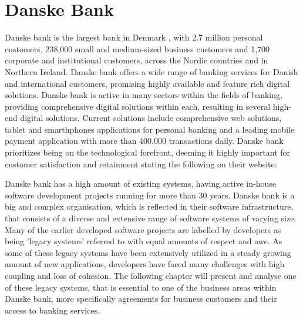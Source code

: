 \chapter{Danske Bank}

Danske bank is the largest bank in Denmark \cite[p.~38]{danske_bank_setting_up_in_denmark}, with 2.7 million personal customers, 238,000 small and medium-sized business customers and 1,700 corporate and institutional customers, across the Nordic countries and in Northern Ireland. Danske bank offers a wide range of banking services for Danish and international customers, promising highly available and feature rich digital solutions. Danske bank is active in many sectors within the fields of banking, providing comprehensive digital solutions within each, resulting in several high-end digital solutions. Current solutions include comprehensive web solutions, tablet and smarthphones applications for personal banking and a leading mobile payment application with more than 400.000 transactions daily. Danske bank prioritizes being on the technological forefront, deeming it highly important for customer satisfaction and retainment stating the following on their website\cite{danske_bank_our_essence}:



Danske bank has a high amount of existing systems, having active in-house software development projects running for more than 30 years. Danske bank is a big and complex organisation, which is reflected in their software infrastructure, that consists of a diverse and extensive range of software systems of varying size. Many of the earlier developed software projects are labelled by developers as being 'legacy systems' referred to with equal amounts of respect and awe. As some of these legacy systems have been extensively utilized in a steady growing amount of new applications, developers have faced many challenges with high coupling and loss of cohesion. The following chapter will present and analyse one of these legacy systems, that is essential to one of the business areas within Danske bank, more specifically agreements for business customers and their access to banking services.

